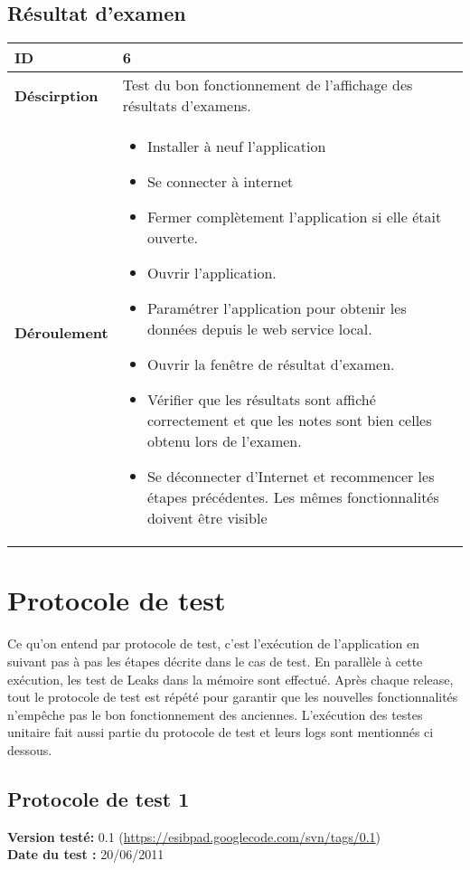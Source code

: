 		\subsection{Résultat d'examen}
					 \begin{longtable}{m{4cm}|p{10cm}|}
					 \textbf{ ID} & 6 \\
					 \hline \textbf{Déscirption} & Test du bon fonctionnement de l'affichage des résultats d'examens.\\
					 \hline \textbf{Déroulement} &
						 \begin{itemize}
						  	\item Installer à neuf l'application
						  	\item Se connecter à internet
							 \item Fermer complètement l'application si elle était ouverte.
							 \item Ouvrir l'application.
							 \item Paramétrer l'application pour obtenir les données depuis le web service local.
							 \item Ouvrir la fenêtre de résultat d'examen.
							 \item Vérifier que les résultats sont affiché correctement et que les notes sont bien celles obtenu lors de l'examen.
							\item Se déconnecter d'Internet et recommencer les étapes précédentes. Les mêmes fonctionnalités doivent être visible
						 \end{itemize}
					 \\
				 \end{longtable} 
\section{Protocole de test}
	Ce qu'on entend par protocole de test, c'est l'exécution de l'application en suivant pas à pas les étapes décrite dans le cas de test. En parallèle à cette exécution, les test de Leaks dans la mémoire sont effectué.
	Après chaque release, tout le protocole de test est répété pour garantir que les nouvelles fonctionnalités n'empêche pas le bon fonctionnement des anciennes.
	L'exécution des testes unitaire fait aussi partie du protocole de test et leurs  logs sont mentionnés ci dessous. 
		\subsection{Protocole de test 1}
		\textbf{Version testé:} 0.1 (\url{https://esibpad.googlecode.com/svn/tags/0.1}) \\
		\textbf{	Date du test :} 20/06/2011

